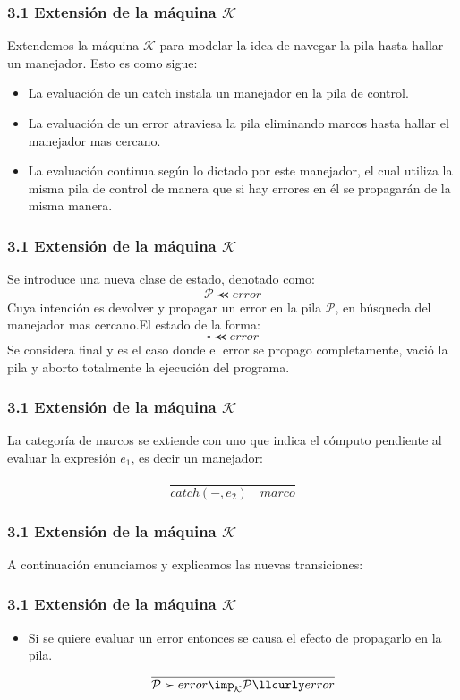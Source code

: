 \documentclass[xcolor=dvipsnames,table,spanish]{beamer}
\begin{document}
\begin{frame}
\frametitle{3.1 Extensión de la máquina $\mathcal{K}$}
Extendemos la máquina $\mathcal{K}$ para modelar la idea de navegar la pila hasta hallar un manejador. Esto es como sigue:
\begin{itemize}
		\item La evaluación de un catch instala un manejador en la pila de control.
		\item La evaluación de un error atraviesa la pila eliminando marcos hasta hallar el manejador mas cercano.
		\item La evaluación continua según lo dictado por este manejador, el cual utiliza la misma pila de control de manera que si hay errores en él se propagarán de la misma manera.
\end{itemize}

\end{frame}

\begin{frame}
\frametitle{3.1 Extensión de la máquina $\mathcal{K}$}
Se introduce una nueva clase de estado, denotado como: \[\mathcal{P} \llcurly error\] Cuya intención es devolver y propagar un error en la pila $\mathcal{P}$, en búsqueda del manejador mas cercano.\newline El estado de la forma: \[ \square \llcurly error \] Se considera final y es el caso donde el error se propago completamente, vació la pila y aborto totalmente la ejecución del programa.
\end{frame}

\begin{frame}
\frametitle{3.1 Extensión de la máquina $\mathcal{K}$}
La categoría de marcos se extiende con uno que indica el cómputo pendiente al evaluar la expresión $e_1$, es decir un manejador:

\[\frac{}{catch(-,e_2) \quad marco}\]

\end{frame}

\begin{frame}
\frametitle{3.1 Extensión de la máquina $\mathcal{K}$}
A continuación enunciamos y explicamos las nuevas transiciones:
\end{frame}

\begin{frame}
\frametitle{3.1 Extensión de la máquina $\mathcal{K}$}
\begin{itemize}
		\item Si se quiere evaluar un error entonces se causa el efecto de propagarlo en la pila.
        \[ \frac{}{\mathcal{P} \succ error \imp_{\mathcal{K}}  \mathcal{P} \llcurly error}\]
\end{itemize}
\end{frame}
\end{document}
